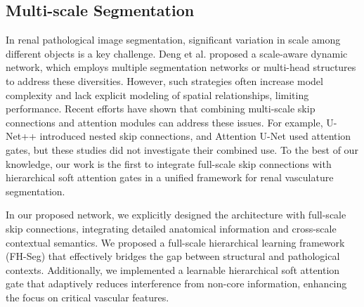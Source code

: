 \subsection{Multi-scale Segmentation}
\label{sec:title}
In renal pathological image segmentation, significant variation in scale among different objects is a key challenge. Deng et al. \cite{Deng2023omni} proposed a scale-aware dynamic network, which employs multiple segmentation networks or multi-head structures to address these diversities. However, such strategies often increase model complexity and lack explicit modeling of spatial relationships, limiting performance. Recent efforts have shown that combining multi-scale skip connections and attention modules can address these issues. For example, U-Net++ \cite{zhou2018unet++} introduced nested skip connections, and Attention U-Net \cite{oktay2018attention} used attention gates, but these studies did not investigate their combined use. To the best of our knowledge, our work is the first to integrate full-scale skip connections with hierarchical soft attention gates in a unified framework for renal vasculature segmentation.

In our proposed network, we explicitly designed the architecture with full-scale skip connections, integrating detailed anatomical information and cross-scale contextual semantics. We proposed a full-scale hierarchical learning framework (FH-Seg) that effectively bridges the gap between structural and pathological contexts. Additionally, we implemented a learnable hierarchical soft attention gate that adaptively reduces interference from non-core information, enhancing the focus on critical vascular features.


